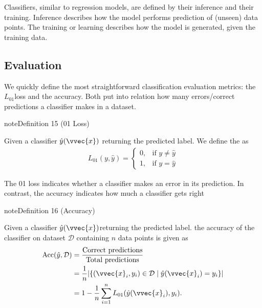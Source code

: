 \documentclass[letterpaper,10pt,english]{jupyterBook}
\begin{document}
\sphinxAtStartPar
Classifiers, similar to regression models, are defined by their inference and their training. Inference describes how the model performs prediction of (unseen) data points. The training or learning describes how the model is generated, given the training data.


\subsection{Evaluation}
\label{\detokenize{classification_problem:evaluation}}
\sphinxAtStartPar
We quickly define the most straightforward classification evaluation metrics: the \(L_{01}\)\sphinxhyphen{}loss and the accuracy. Both put into relation how many errors/correct predictions a classifier makes in a dataset.
\label{classification_problem:definition-0}
\begin{sphinxadmonition}{note}{Definition 15 (0\sphinxhyphen{}1 Loss)}



\sphinxAtStartPar
Given a classifier \(\hat{y}(\vvec{x})\) returning the predicted label. We define the  as
\begin{equation*}
\begin{split}L_{01}(y,\hat{y}) = \begin{cases}
0, & \text{if } y\neq \hat{y}\\
1, & \text{if } y=\hat{y}
\end{cases}\end{split}
\end{equation*}
\end{sphinxadmonition}

\sphinxAtStartPar
The 0\sphinxhyphen{}1 loss indicates whether a classifier makes an error in its prediction. In contrast, the accuracy indicates how much a classifier gets right
\label{classification_problem:definition-1}
\begin{sphinxadmonition}{note}{Definition 16 (Accuracy)}



\sphinxAtStartPar
Given a classifier \(\hat{y}(\vvec{x})\)returning the predicted label. the accuracy of the classifier on dataset \(\mathcal{D}\) containing \(n\) data points is given as
\begin{align*}
\mathrm{Acc}(\hat{y},\mathcal{D}) &= \frac{\text{Correct predictions}}{\text{Total predictions}}\\
&= \frac1n \lvert\{(\vvec{x}_i,y_i)\in\mathcal{D}\mid \hat{y}(\vvec{x}_i)=y_i\}\rvert\\
&= 1- \frac1n\sum_{i=1}^n L_{01}(\hat{y}(\vvec{x}_i),y_i).
\end{align*}\end{sphinxadmonition}
\end{document}
